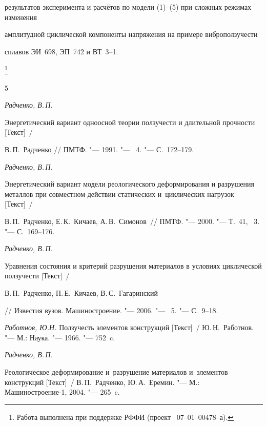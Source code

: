 результатов эксперимента и расчётов по модели (1)--(5) при сложных режимах изменения 

амплитудной циклической компоненты напряжения на примере виброползучести 

сплавов ЭИ~698, ЭП~742 и ВТ~3--1.



\thanks{Работа выполнена при поддержке РФФИ {\rm(}проект \No~07--01--00478--а{\rm)}.}







\begin{thebibliography}{5}

\item \textit{Радченко, В.\,П.} 

Энергетический вариант одноосной теории ползучести и длительной прочности [Текст]~/

В.\,П.~Радченко  /\!/ ПМТФ. "--- 1991. "--- \No~4. "--- С.~172--179.



\item \textit{Радченко, В.\,П.} 

Энергетический вариант модели реологического деформирования и разрушения металлов при совместном действии статических и~циклических нагрузок [Текст]~/

В.\,П.~Радченко, Е.\,К.~Кичаев, А.\,В.~Симонов~/\!/ ПМТФ. "--- 2000. "--- Т.~41, \No~3. "--- С.~169--176.



\item \textit{Радченко, В.\,П.} 

Уравнения состояния и критерий разрушения материалов в условиях циклической ползучести [Текст]~/

В.\,П.~Радченко, П.\,Е.~Кичаев, В.\,С.~Гагаринский 

/\!/ Известия вузов. Машиностроение. "--- 2006. "--- \No~5. "--- С.~9--18. 



\item \textit{Работнов, Ю.Н.} Ползучесть элементов конструкций [Текст]~/ Ю.\,Н.~Работнов. "--- М.: Наука. "--- 1966. "--- 752~c. 



\item \textit{Радченко, В.\,П.} 

Реологическое деформирование и~разрушение материалов и~элементов конструкций [Текст]~/  В.\,П.~Радченко, Ю.\,А.~Еремин. "--- М.: Машиностроение-1, 2004. "--- 265~c.

\end{thebibliography}



\makeengtitlem






%


